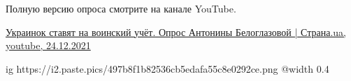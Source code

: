 \begin{multicols}{2}

Полную версию опроса смотрите на канале YouTube.

\href{https://www.youtube.com/watch?v=Yku1ZChgZuo}{%
Украинок ставят на воинский учёт. Опрос Антонины Белоглазовой | Страна.ua, %
youtube, 24.12.2021%
}

\ifcmt
  ig https://i2.paste.pics/497b8f1b82536cb5edafa55c8e0292ce.png
  @width 0.4
\fi


\end{multicols} %
